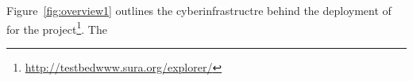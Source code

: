 Figure~\ref{fig:overview1} outlines the cyberinfrastructre behind the
deployment of \sciwms{} for the \comt{}
project\footnote{\url{http://testbedwww.sura.org/explorer/}}. The
